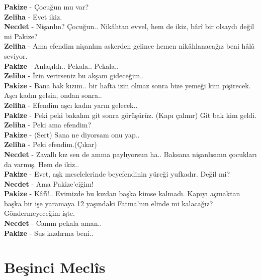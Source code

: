 \documentclass[]{book}
\begin{document}
\textbf{Pakize} - Çocuğun mu var?\\
\textbf{Zeliha} - Evet ikiz.\\
\textbf{Necdet} - Nişanlın? Çocuğun.. Nikâhtan evvel, hem de ikiz, bârî bir olsaydı değil mi Pakize?\\
\textbf{Zeliha} - Ama efendim nişanlım askerden gelince hemen nikâhlanacağız beni hâlâ seviyor.\\
\textbf{Pakize} - Anlaşıldı.. Pekala.. Pekala..\\
\textbf{Zeliha} - İzin verirseniz bu akşam gideceğim..\\
\textbf{Pakize} - Bana bak kızım.. bir hafta izin olmaz sonra bize yemeği kim pişirecek. Aşcı kadın gelsin, ondan sonra..\\
\textbf{Zeliha} - Efendim aşcı kadın yarın gelecek..\\
\textbf{Pakize} - Peki peki bakalım git sonra görüşürüz. (Kapı çalınır) Git bak kim geldi.\\
\textbf{Zeliha} - Peki ama efendim?\\
\textbf{Pakize} - (Sert) Sana ne diyorsam onu yap..\\
\textbf{Zeliha} - Peki efendim.(Çıkar)\\
\textbf{Necdet} - Zavallı kız sen de amma paylıyorsun ha.. Baksana nişanlısının çocukları da varmış. Hem de ikiz..\\
\textbf{Pakize} - Evet, aşk meselelerinde beyefendinin yüreği yufkadır. Değil mi?\\
\textbf{Necdet} - Ama Pakize'ciğim!\\
\textbf{Pakize} - Kâfî!.. Evimizde bu kızdan başka kimse kalmadı. Kapıyı açmaktan başka bir işe yaramaya 12 yaşındaki Fatma'nın elinde mi kalacağız? Göndermeyeceğim işte.\\
\textbf{Necdet} - Canım pekala aman..\\
\textbf{Pakize} - Sus kızdırma beni..\\

\hypertarget{besinci-meclis}{%
\section{Beşinci Meclîs}\label{besinci-meclis}}
\end{document}

